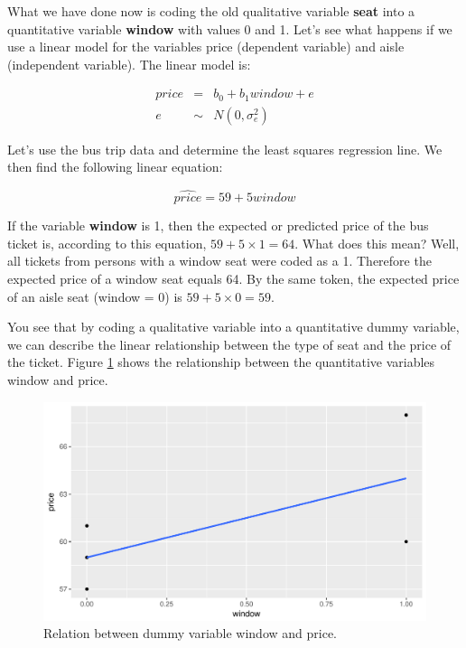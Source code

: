 \documentclass[]{report}\usepackage[]{graphicx}\usepackage[]{color}
\makeatletter
\def\maxwidth{ %
  \ifdim\Gin@nat@width>\linewidth
    \linewidth
  \else
    \Gin@nat@width
  \fi
}
\newenvironment{knitrout}{}{} %
\makeatother
\begin{document}
What we have done now is coding the old qualitative variable \textbf{seat} into a quantitative variable \textbf{window} with values 0 and 1. Let's see what happens if we use a linear model for the variables price (dependent variable) and aisle (independent variable). The linear model is:

\begin{eqnarray}
price &=& b_0 + b_1 window + e \\
e &\sim& N(0,\sigma^2_e)
\end{eqnarray}

Let's use the bus trip data and determine the least squares regression line. We then find the following linear equation:


\begin{equation}
\widehat{price} = 59 + 5 window
\end{equation}

If the variable \textbf{window} is 1, then the expected or predicted price of the bus ticket is, according to this equation, $59 + 5\times  1= 64$. What does this mean? Well, all tickets from persons with a window seat were coded as a 1. Therefore the expected price of a window seat equals 64. By the same token, the expected price of an aisle seat (window = 0) is $59 + 5\times 0= 59$.

You see that by coding a qualitative variable into a quantitative dummy variable, we can describe the linear relationship between the type of seat and the price of the ticket. Figure \ref{fig:dummy_3} shows the relationship between the quantitative variables window and price. 

\begin{knitrout}
\color{fgcolor}\begin{figure}

{\centering \includegraphics[width=\maxwidth]{figure/dummy_3-1} 

}

\caption[Relation between dummy variable window and price]{Relation between dummy variable window and price.}\label{fig:dummy_3}
\end{figure}


\end{knitrout}
\end{document}
